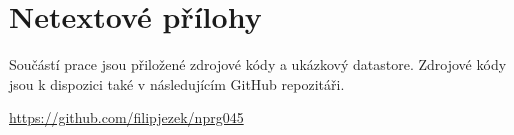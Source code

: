 \chapter{Netextové přílohy}
\label{app:appendices}

Součástí prace jsou přiložené zdrojové kódy a ukázkový datastore. Zdrojové kódy jsou k dispozici také v následujícím GitHub repozitáři.

\begin{center}
  \url{https://github.com/filipjezek/nprg045}
\end{center}